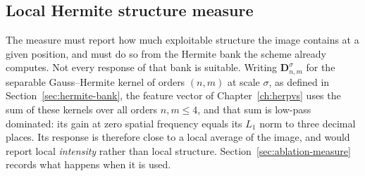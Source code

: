 %
%
%
%
%
%

\subsection{Local Hermite structure measure}
\label{sec:hermite-gate}

The measure must report how much exploitable structure the image contains at
a given position, and must do so from the Hermite bank the scheme already
computes. Not every response of that bank is suitable. Writing
$\mathbf{D}_{n,m}^{\sigma}$ for the separable Gauss--Hermite kernel of orders
$(n,m)$ at scale $\sigma$, as defined in Section~\ref{sec:hermite-bank}, the
feature vector of Chapter~\ref{ch:herpvs} uses the sum of these kernels over
all orders $n,m\le4$, and that sum is low-pass dominated: its gain at zero
spatial frequency equals its $L_{1}$ norm to three decimal places. Its
response is therefore close to a local average of the image, and would report
local \emph{intensity} rather than local structure. Section~\ref{sec:ablation-measure}
records what happens when it is used.

